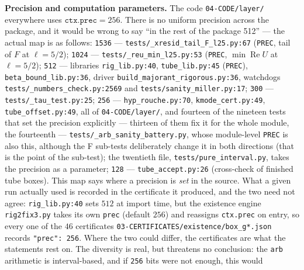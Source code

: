\textbf{Precision and computation parameters.} The code \texttt{04-\allowbreak CODE/\allowbreak layer/\allowbreak } everywhere uses
$\texttt{ctx.prec} = 256$. There is no uniform precision across the package, and it would be wrong
to say ``in the rest of the package 512'' --- the actual map is as follows:
\texttt{1536} --- \texttt{tests/\allowbreak \_\allowbreak xresid\_\allowbreak tail\_\allowbreak F\_\allowbreak l25.py:67} (\texttt{PREC}, tail of $F$ at $\ell = 5/2$);
\texttt{1024} --- \texttt{tests/\allowbreak \_\allowbreak reu\_\allowbreak min\_\allowbreak l25.py:53} (\texttt{PREC}, $\min \operatorname{Re} U$ at $\ell = 5/2$);
\texttt{512} --- libraries \texttt{rig\_\allowbreak lib.py:40}, \texttt{tube\_\allowbreak lib.py:45} (\texttt{PREC}),
\texttt{beta\_\allowbreak bound\_\allowbreak lib.py:36}, driver \texttt{build\_\allowbreak majorant\_\allowbreak rigorous.py:36}, watchdogs
\texttt{tests/\allowbreak \_\allowbreak numbers\_\allowbreak check.py:2569} and \texttt{tests/\allowbreak sanity\_\allowbreak miller.py:17};
\texttt{300} --- \texttt{tests/\allowbreak \_\allowbreak tau\_\allowbreak test.py:25};
\texttt{256} --- \texttt{hyp\_\allowbreak rouche.py:70}, \texttt{kmode\_\allowbreak cert.py:49}, \texttt{tube\_\allowbreak offset.py:49}, all of
\texttt{04-\allowbreak CODE/\allowbreak layer/\allowbreak }, and fourteen of the nineteen tests that set the precision
explicitly --- thirteen of them fix it for the whole module, the fourteenth ---
\texttt{tests/\allowbreak \_\allowbreak arb\_\allowbreak sanity\_\allowbreak battery.py}, whose module-level \texttt{PREC} is also this, although
the F sub-tests deliberately change it in both directions (that is the point of the sub-test);
the twentieth file, \texttt{tests/\allowbreak pure\_\allowbreak interval.py}, takes the precision as a parameter;
\texttt{128} --- \texttt{tube\_\allowbreak accept.py:26} (cross-check of finished tube boxes).
This map says where a precision is \emph{set} in the source. What a given run
actually used is recorded in the certificate it produced, and the two need not
agree: \texttt{rig\_\allowbreak lib.py:40} sets $512$ at import time, but the
existence engine \texttt{rig2\allowbreak fix3.py} takes its own \texttt{prec}
(default $256$) and reassigns \texttt{ctx.prec} on entry, so every one of the
$46$ certificates \texttt{03-\allowbreak CERTIFICATES/\allowbreak existence/\allowbreak box\_\allowbreak g*.json}
records \texttt{"prec": 256}. Where the two could differ, the certificates are
what the statements rest on.
The diversity is real, but threatens no conclusion:
the \texttt{arb} arithmetic is interval-based, and if \texttt{256} bits were not enough, this would

